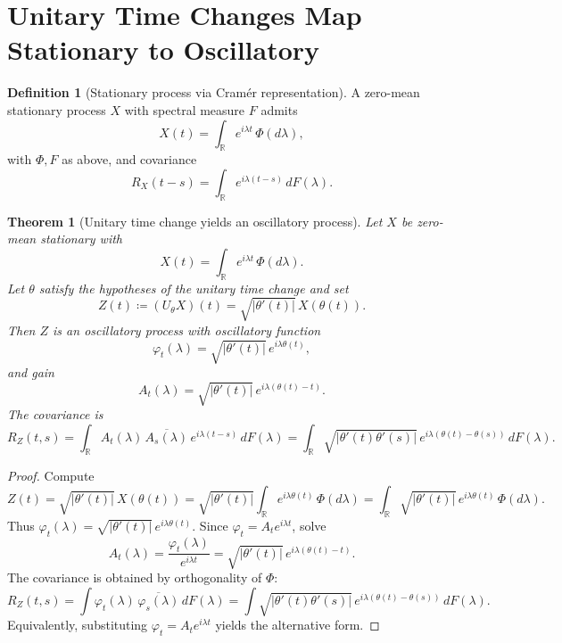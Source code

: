 \documentclass[12pt]{article}
\newtheorem{theorem}{Theorem}
\theoremstyle{definition}
\newtheorem{definition}{Definition}
\theoremstyle{remark}
\begin{document}
\section{Unitary Time Changes Map Stationary to Oscillatory}

\begin{definition}[Stationary process via Cram\'er representation]
A zero-mean stationary process $X$ with spectral measure $F$ admits
\begin{equation}
  X(t) = \int_{\mathbb{R}} e^{i\lambda t}\,\Phi(d\lambda),
\end{equation}
with $\Phi, F$ as above, and covariance
\begin{equation}
  R_X(t-s)=\int_{\mathbb{R}} e^{i\lambda(t-s)}\,dF(\lambda).
\end{equation}
\end{definition}

\begin{theorem}[Unitary time change yields an oscillatory process]
Let $X$ be zero-mean stationary with
\[
X(t)=\int_{\mathbb{R}} e^{i\lambda t}\,\Phi(d\lambda).
\]
Let $\theta$ satisfy the hypotheses of the unitary time change and set
\begin{equation}
  Z(t)\coloneqq (U_\theta X)(t)=\sqrt{|\theta'(t)|}\,X(\theta(t)).
\end{equation}
Then $Z$ is an oscillatory process with oscillatory function
\begin{equation}
  \varphi_t(\lambda)=\sqrt{|\theta'(t)|}\,e^{i\lambda \theta(t)},
\end{equation}
and gain
\begin{equation}
  A_t(\lambda)=\sqrt{|\theta'(t)|}\,e^{i\lambda(\theta(t)-t)}.
\end{equation}
The covariance is
\begin{equation}
  R_Z(t,s)=\int_{\mathbb{R}} A_t(\lambda)\,\overline{A_s(\lambda)}\,e^{i\lambda(t-s)}\,dF(\lambda)
  = \int_{\mathbb{R}} \sqrt{|\theta'(t)\theta'(s)|}\,e^{i\lambda(\theta(t)-\theta(s))}\,dF(\lambda).
\end{equation}
\end{theorem}

\begin{proof}
Compute
\[
Z(t)=\sqrt{|\theta'(t)|}\,X(\theta(t))
=\sqrt{|\theta'(t)|}\int_{\mathbb{R}} e^{i\lambda \theta(t)}\,\Phi(d\lambda)
=\int_{\mathbb{R}} \sqrt{|\theta'(t)|}\,e^{i\lambda \theta(t)}\,\Phi(d\lambda).
\]
Thus $\varphi_t(\lambda)=\sqrt{|\theta'(t)|}\,e^{i\lambda \theta(t)}$. Since $\varphi_t=A_t e^{i\lambda t}$, solve
\[
A_t(\lambda)=\frac{\varphi_t(\lambda)}{e^{i\lambda t}}
=\sqrt{|\theta'(t)|}\,e^{i\lambda(\theta(t)-t)}.
\]
The covariance is obtained by orthogonality of $\Phi$:
\[
R_Z(t,s)=\int \varphi_t(\lambda)\,\overline{\varphi_s(\lambda)}\,dF(\lambda)
=\int \sqrt{|\theta'(t)\theta'(s)|}\,e^{i\lambda(\theta(t)-\theta(s))}\,dF(\lambda).
\]
Equivalently, substituting $\varphi_t=A_t e^{i\lambda t}$ yields the alternative form.
\end{proof}
\end{document}
